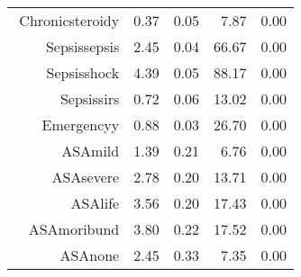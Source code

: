 \begin{tabular}{rrrrr}
$$  Chronic\-steroid\-y & 0.37 & 0.05 & 7.87 & 0.00 \\ 
  Sepsis\-sepsis & 2.45 & 0.04 & 66.67 & 0.00 \\ 
  Sepsis\-shock & 4.39 & 0.05 & 88.17 & 0.00 \\ 
  Sepsis\-sirs & 0.72 & 0.06 & 13.02 & 0.00 \\ 
  Emergency\-y & 0.88 & 0.03 & 26.70 & 0.00 \\ 
  ASA\-mild & 1.39 & 0.21 & 6.76 & 0.00 \\ 
  ASA\-severe & 2.78 & 0.20 & 13.71 & 0.00 \\ 
  ASA\-life & 3.56 & 0.20 & 17.43 & 0.00 \\ 
  ASA\-moribund & 3.80 & 0.22 & 17.52 & 0.00 \\ 
  ASA\-none & 2.45 & 0.33 & 7.35 & 0.00 \\ 
   \hline
\end{tabular}


